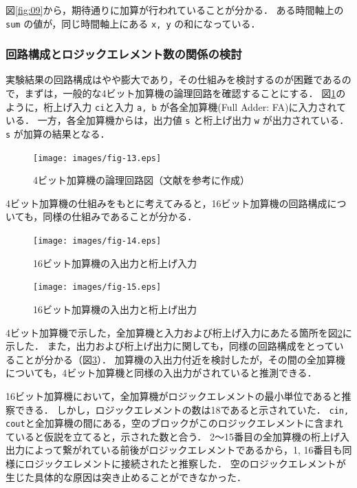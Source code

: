 \documentclass[uplatex]{jsarticle}
\begin{document}
図\ref{fig:09}から，期待通りに加算が行われていることが分かる．
ある時間軸上の {\tt sum} の値が，同じ時間軸上にある {\tt x, y} の和になっている．

\subsubsection{回路構成とロジックエレメント数の関係の検討}

実験結果の回路構成はやや膨大であり，その仕組みを検討するのが困難であるので，まずは，一般的な4ビット加算機の論理回路を確認することにする．
図\ref{fig:13}のように，桁上げ入力 {\tt ci}と入力 {\tt a, b} が各全加算機(Full Adder: FA)に入力されている．
一方，各全加算機からは，出力値 {\tt s} と桁上げ出力 {\tt w} が出力されている．
{\tt s} が加算の結果となる．

\begin{figure}[htb]
  \begin{center}
    \texttt{[image: images/fig-13.eps]}
    \caption{4ビット加算機の論理回路図（文献\cite{hdl}を参考に作成）}
    \label{fig:13}
  \end{center}
\end{figure}

4ビット加算機の仕組みをもとに考えてみると，16ビット加算機の回路構成についても，同様の仕組みであることが分かる．

\begin{figure}[htb]
  \begin{center}
    \texttt{[image: images/fig-14.eps]}
    \caption{16ビット加算機の入出力と桁上げ入力}
    \label{fig:14}
  \end{center}
\end{figure}

\begin{figure}[htb]
  \begin{center}
    \texttt{[image: images/fig-15.eps]}
    \caption{16ビット加算機の入出力と桁上げ出力}
    \label{fig:15}
  \end{center}
\end{figure}

4ビット加算機で示した，全加算機と入力および桁上げ入力にあたる箇所を図\ref{fig:14}に示した．
また，出力および桁上げ出力に関しても，同様の回路構成をとっていることが分かる（図\ref{fig:15}）．
加算機の入出力付近を検討したが，その間の全加算機についても，4ビット加算機と同様の入出力がされていると推測できる．

16ビット加算機において，全加算機がロジックエレメントの最小単位であると推察できる．
しかし，ロジックエレメントの数は18であると示されていた．
{\tt cin, cout}と全加算機の間にある，空のブロックがこのロジックエレメントに含まれていると仮説を立てると，示された数と合う．
2〜15番目の全加算機の桁上げ入出力によって繋がれている前後がロジックエレメントであるから，1, 16番目も同様にロジックエレメントに接続されたと推察した．
空のロジックエレメントが生じた具体的な原因は突き止めることができなかった．
\end{document}
